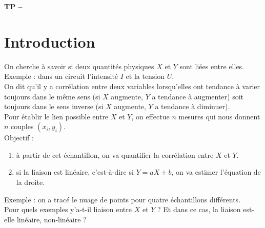 





\begin{center}
{\Large\bf TP \no {\numero} -- \descrip}
\end{center}



\section{Introduction}
\noindent On cherche \` a savoir si deux quantit\' es physiques $X$ et $Y$ sont li\' ees entre elles. Exemple : dans un circuit l'intensit\' e $I$ et la tension $U$.  \\
On dit qu'il y a corr\' elation entre deux variables lorsqu'elles ont tendance \` a varier toujours dans le m\^ eme sens (si $X$ augmente, $Y$ a tendance \` a augmenter) soit toujours dans le sens inverse (si $X$ augmente, $Y$ a tendance \` a diminuer).\\
Pour \' etablir le lien possible entre $X$ et $Y$, on effectue $n$ mesures qui nous donnent $n$ couples $(x_i,y_i)$. \\
Objectif :
\begin{enumerate}
 \item \` a partir de cet \' echantillon, on va quantifier la corr\' elation entre $X$ et $Y$.
 \item si la liaison est lin\' eaire, c'est-\` a-dire si $Y=aX+b$, on va estimer l'\' equation de la droite.
 \end{enumerate} 
Exemple : on a trac\' e le nuage de points pour quatre \' echantillons diff\' erents.\\
Pour quels exemples y'a-t-il liaison entre $X$ et $Y$ ? Et dans ce cas, la liaison est-elle lin\' eaire, non-lin\' eaire ?
